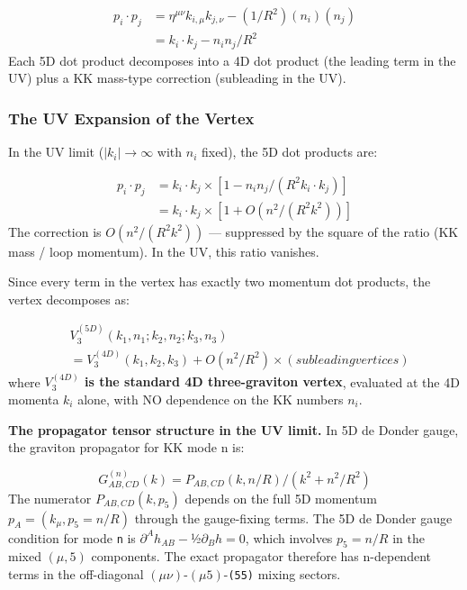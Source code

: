 \documentclass[aps,prd,preprint,superscriptaddress,longbibliography,floatfix]{revtex4-2}
\theoremstyle{remark}
\begin{document}
\begin{align}
    p_i \cdot p_j &= \eta^{\mu\nu} k_{i,\mu} k_{j,\nu} - (1/R^{2})(n_i)(n_j) \\
    & = k_i \cdot k_j - n_i n_j / R^{2}
\end{align}
Each 5D dot product decomposes into a 4D dot product (the leading term in the UV) plus a KK mass-type correction (subleading in the UV).


\subsubsection{The UV Expansion of the Vertex}

In the UV limit ($|k_i| \to \infty$ with $n_i$ fixed), the 5D dot products are:


\begin{align}
    p_i \cdot p_j &= k_i \cdot k_j \times [1 - n_i n_j / (R^{2} k_i \cdot k_j)] \\
    & = k_i \cdot k_j \times [1 + O(n^{2}/(R^{2}k^{2}))]
\end{align}
The correction is $O(n^{2}/(R^{2}k^{2}))$ --- suppressed by the square of the ratio (KK mass / loop momentum). In the UV, this ratio vanishes.

Since every term in the vertex has exactly two momentum dot products, the vertex decomposes as:


\begin{align}
    & V_{3}^{(5D)}(k_{1},n_{1}; k_{2},n_{2}; k_{3},n_{3}) \\
    & = V_{3}^{(4D)}(k_{1}, k_{2}, k_{3}) + O(n^{2}/R^{2}) \times (subleading vertices)
\end{align}
where \textbf{$V_{3}^{(4D)}$ is the standard 4D three-graviton vertex}, evaluated at the 4D momenta $k_i$ alone, with NO dependence on the KK numbers $n_i$.

\textbf{The propagator tensor structure in the UV limit.} In 5D de Donder gauge, the graviton propagator for KK mode n is:


\begin{equation}
    G_{AB,CD}^{(n)}(k) = P_{AB,CD}(k, n/R) / (k^{2} + n^{2}/R^{2})
\end{equation}
The numerator $P_{AB,CD}(k, p_{5})$ depends on the full 5D momentum $p_A = (k_\mu, p_{5} = n/R)$ through the gauge-fixing terms. The 5D de Donder gauge condition for mode \texttt{n} is $\partial^A h_{AB} - $½$\partial_B h = 0$, which involves $p_{5} = n/R$ in the mixed $(\mu,5)$ components. The exact propagator therefore has n-dependent terms in the off-diagonal $(\mu\nu)$-$(\mu5)$-\texttt{(55)} mixing sectors.
\end{document}
